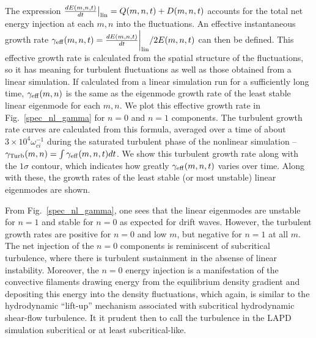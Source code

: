 \documentclass[showpacs,preprintnumbers,amsmath,amssymb,superscriptaddress,aip]{revtex4-1}
\newcommand{\diff}[2]{\frac{d#1}{d#2}}
\begin{document}
The expression $\diff{E(m,n,t)}{t}\big|_{\rm{lin}} = Q(m,n,t) + D(m,n,t)$ accounts for the total net energy injection at each $m,n$ into the fluctuations. 
An effective instantaneous growth rate $\gamma_{\rm{eff}}(m,n,t) = \diff{E(m,n,t)}{t}\bigg|_{\rm{lin}}/ 2 E(m,n,t)$ can then be defined. 
This effective growth rate is calculated from the spatial structure of the fluctuations, so it has meaning for turbulent fluctuations as well as those obtained from a linear simulation. If calculated
from a linear simulation run for a sufficiently long time, $\gamma_{\rm{eff}}(m,n)$ is the same as the eigenmode growth rate of the least stable linear eigenmode for each $m,n$.
We plot this effective growth rate in Fig.~\ref{spec_nl_gamma} for $n=0$ and $n=1$ components. The turbulent growth rate curves are calculated from this formula, 
averaged over a time of about $3 \times 10^{4} \omega_{ci}^{-1}$ during the saturated turbulent phase of the nonlinear simulation --$\gamma_{\rm{Turb}}(m,n) = \int \gamma_{\rm{eff}}(m,n,t) dt$. 
We show this turbulent growth rate along with the $1 \sigma$ contour, which indicates how greatly $\gamma_{\rm{eff}}(m,n,t)$ varies over time.
Along with these, the growth rates of the least stable (or most unstable) linear eigenmodes are shown.

From Fig.~\ref{spec_nl_gamma}, one sees that the linear eigenmodes are unstable for $n=1$ and stable for $n=0$ as expected for drift waves. 
However, the turbulent growth rates are positive for $n=0$ and low $m$, but negative for $n=1$ at all $m$. 
The net injection of the $n=0$ components is reminiscent of subcritical turbulence, where there is turbulent sustainment in the absense of linear instability.
Moreover, the $n=0$ energy injection is a manifestation of the convective filaments drawing energy from the equilibrium density gradient and depositing this energy into the density fluctuations,
which again, is similar to the hydrodynamic ``lift-up'' mechanism associated with subcritical hydrodynamic shear-flow turbulence.
It it prudent then to call the turbulence in the LAPD simulation subcritical or at least subcritical-like. 
\end{document}
